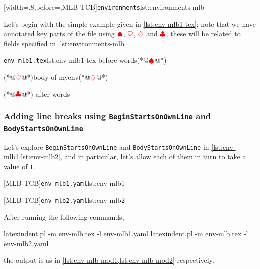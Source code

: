 	[width=.8\linewidth,before=\centering,MLB-TCB]{\texttt{environments}}{lst:environments-mlb}

	Let's begin with the simple example given in \cref{lst:env-mlb1-tex}; note that we have annotated key parts of the file using $\color{red}\spadesuit$,
	$\color{red}\heartsuit$, $\color{red}\diamondsuit$ and $\color{red}\clubsuit$, these will be related to fields specified in \cref{lst:environments-mlb}.

	\begin{cmhlistings}[escapeinside={(*@}{@*)}]{\texttt{env-mlb1.tex}}{lst:env-mlb1-tex}
before words(*@$\color{red}\spadesuit$@*) \begin{myenv}(*@$\color{red}\heartsuit$@*)body of myenv(*@$\color{red}\diamondsuit$@*)\end{myenv}(*@$\color{red}\clubsuit$@*) after words
\end{cmhlistings}

\subsubsection[Adding line breaks: \texttt{BeginStartsOnOwnLine} and \texttt{BodyStartsOnOwnLine}]{Adding line breaks using \texttt{BeginStartsOnOwnLine} and \texttt{BodyStartsOnOwnLine}}
	Let's explore \texttt{BeginStartsOnOwnLine} and \texttt{BodyStartsOnOwnLine} in \cref{lst:env-mlb1,lst:env-mlb2}, and in particular,
	let's allow each of them in turn to take a value of $1$.

	\begin{minipage}{.45\textwidth}
		[MLB-TCB]{\texttt{env-mlb1.yaml}}{lst:env-mlb1}
	\end{minipage}
	\hfill
	\begin{minipage}{.45\textwidth}
		[MLB-TCB]{\texttt{env-mlb2.yaml}}{lst:env-mlb2}
	\end{minipage}

	After running the following commands,
	\begin{commandshell}
latexindent.pl -m env-mlb.tex -l env-mlb1.yaml
latexindent.pl -m env-mlb.tex -l env-mlb2.yaml
\end{commandshell}
	the output is as in \cref{lst:env-mlb-mod1,lst:env-mlb-mod2} respectively.

	\begin{widepage}
		\begin{minipage}{.56\linewidth}
		\end{minipage}
		\hfill
		\begin{minipage}{.43\linewidth}
		\end{minipage}
	\end{widepage}

